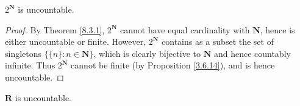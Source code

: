 \begin{corollary}\label{8.3.3}
\(2^{\mathbf{N}}\) is uncountable.
\end{corollary}

\begin{proof}
By Theorem \ref{8.3.1}, \(2^{\mathbf{N}}\) cannot have equal cardinality with \(\mathbf{N}\), hence is either uncountable or finite.
However, \(2^{\mathbf{N}}\) contains as a subset the set of singletons \(\{\{n\} : n \in \mathbf{N}\}\), which is clearly bijective to \(\mathbf{N}\) and hence countably infinite.
Thus \(2^{\mathbf{N}}\) cannot be finite (by Proposition \ref{3.6.14}), and is hence uncountable.
\end{proof}

\begin{corollary}\label{8.3.4}
\(\mathbf{R}\) is uncountable.
\end{corollary}


